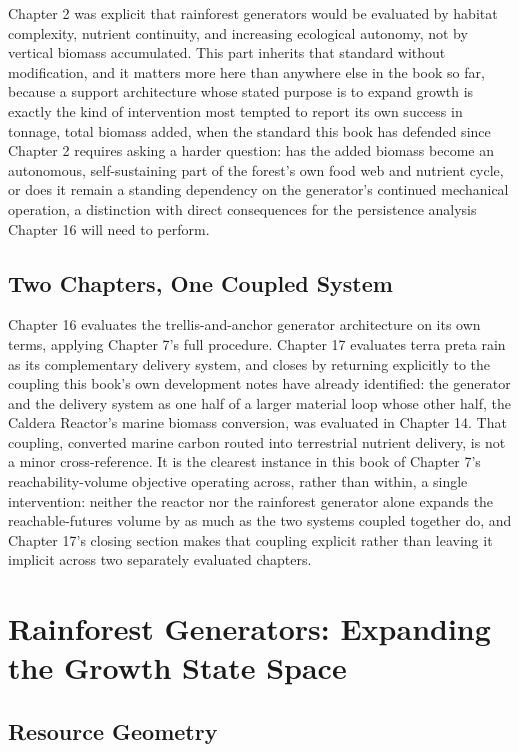 \documentclass[11pt,oneside]{book}
\begin{document}
Chapter 2 was explicit that rainforest generators would be evaluated by habitat complexity, nutrient continuity, and increasing ecological autonomy, not by vertical biomass accumulated. This part inherits that standard without modification, and it matters more here than anywhere else in the book so far, because a support architecture whose stated purpose is to expand growth is exactly the kind of intervention most tempted to report its own success in tonnage, total biomass added, when the standard this book has defended since Chapter 2 requires asking a harder question: has the added biomass become an autonomous, self-sustaining part of the forest's own food web and nutrient cycle, or does it remain a standing dependency on the generator's continued mechanical operation, a distinction with direct consequences for the persistence analysis Chapter 16 will need to perform.

\section*{Two Chapters, One Coupled System}

Chapter 16 evaluates the trellis-and-anchor generator architecture on its own terms, applying Chapter 7's full procedure. Chapter 17 evaluates terra preta rain as its complementary delivery system, and closes by returning explicitly to the coupling this book's own development notes have already identified: the generator and the delivery system as one half of a larger material loop whose other half, the Caldera Reactor's marine biomass conversion, was evaluated in Chapter 14. That coupling, converted marine carbon routed into terrestrial nutrient delivery, is not a minor cross-reference. It is the clearest instance in this book of Chapter 7's reachability-volume objective operating across, rather than within, a single intervention: neither the reactor nor the rainforest generator alone expands the reachable-futures volume by as much as the two systems coupled together do, and Chapter 17's closing section makes that coupling explicit rather than leaving it implicit across two separately evaluated chapters.

\chapter{Rainforest Generators: Expanding the Growth State Space}

\section*{Resource Geometry}
\end{document}
